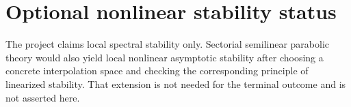\section*{Optional nonlinear stability status}
The project claims local spectral stability only.  Sectorial semilinear
parabolic theory would also yield local nonlinear asymptotic stability after
choosing a concrete interpolation space and checking the corresponding
principle of linearized stability.  That extension is not needed for the
terminal outcome and is not asserted here.
